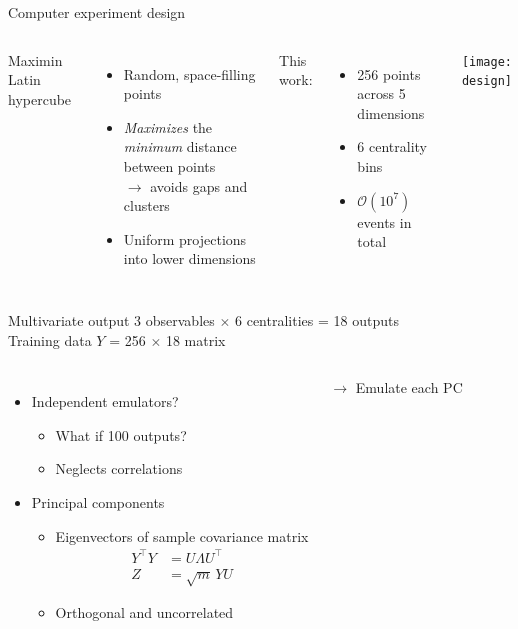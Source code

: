 \documentclass{beamer}
\newcommand{\tran}{^\intercal}
\newcommand{\order}[1]{$\mathcal O(10^{#1})$}
\begin{document}
\begin{frame}{Computer experiment design}
  \begin{columns}
    Maximin Latin hypercube
    \begin{itemize}
      \item Random, space-filling points
      \item \emph{Maximizes} the \emph{minimum} distance between points \\
        $\rightarrow$ avoids gaps and clusters
      \item Uniform projections into lower dimensions
    \end{itemize}
    \smallskip
    This work:
    \begin{itemize}
      \item 256 points across 5 dimensions
      \item 6 centrality bins
      \item \order 7 events in total
    \end{itemize}

    \texttt{[image: design]}
  \end{columns}
\end{frame}


\begin{frame}{Multivariate output}
  3 observables $\times$ 6 centralities = 18 outputs \\
  Training data $Y$ = 256 $\times$ 18 matrix
  \smallskip
  \begin{columns}[c]
    \begin{itemize}
      \item Independent emulators?
        \begin{itemize}
          \item What if 100 outputs?
          \item Neglects correlations
        \end{itemize}
      \item Principal components
        \begin{itemize}
          \item Eigenvectors of sample covariance matrix
            \begin{align*}
              Y\tran Y &= U \Lambda U\tran \\
              Z &= \sqrt m \, YU
            \end{align*}
          \item Orthogonal and uncorrelated
        \end{itemize}
    \end{itemize}
    \centering
    $\rightarrow$ Emulate each PC
    \centering
  \end{columns}
\end{frame}
\end{document}
